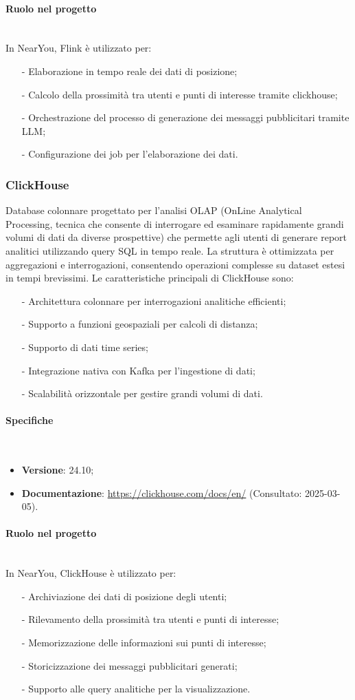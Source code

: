 \documentclass[10pt]{article}
\newcommand{\myparagraph}[1]{\paragraph{#1}\mbox{}\\}
\begin{document}
\myparagraph{Ruolo nel progetto}
In NearYou, Flink è utilizzato per:
\begin{itemize}
    \item[-] Elaborazione in tempo reale dei dati di posizione;
    \item[-] Calcolo della prossimità tra utenti e punti di interesse tramite clickhouse;
    \item[-] Orchestrazione del processo di generazione dei messaggi pubblicitari tramite LLM;
    \item[-] Configurazione dei job per l'elaborazione dei dati.
\end{itemize}

\subsubsection{ClickHouse}
Database colonnare progettato per l'analisi OLAP (OnLine Analytical Processing, tecnica che consente di interrogare ed esaminare rapidamente grandi volumi di dati da diverse prospettive) che permette agli utenti di generare report analitici utilizzando query SQL in tempo reale.
La struttura è ottimizzata per aggregazioni e interrogazioni, consentendo operazioni complesse su dataset estesi in tempi brevissimi.
Le caratteristiche principali di ClickHouse sono:
\begin{itemize}
    \item[-] Architettura colonnare per interrogazioni analitiche efficienti;
    \item[-] Supporto a funzioni geospaziali per calcoli di distanza;
    \item[-] Supporto di dati time series;
    \item[-] Integrazione nativa con Kafka per l'ingestione di dati;
    \item[-] Scalabilità orizzontale per gestire grandi volumi di dati.
\end{itemize}


\myparagraph{Specifiche}
\begin{itemize}
    \item \textbf{Versione}: 24.10;
    \item \textbf{Documentazione}: \textcolor{blue}{\url{https://clickhouse.com/docs/en/}} (Consultato: 2025-03-05).
\end{itemize}

\myparagraph{Ruolo nel progetto}
In NearYou, ClickHouse è utilizzato per:
\begin{itemize}
    \item[-] Archiviazione dei dati di posizione degli utenti;
    \item[-] Rilevamento della prossimità tra utenti e punti di interesse;
    \item[-] Memorizzazione delle informazioni sui punti di interesse;
    \item[-] Storicizzazione dei messaggi pubblicitari generati;
    \item[-] Supporto alle query analitiche per la visualizzazione.
\end{itemize}
\end{document}
